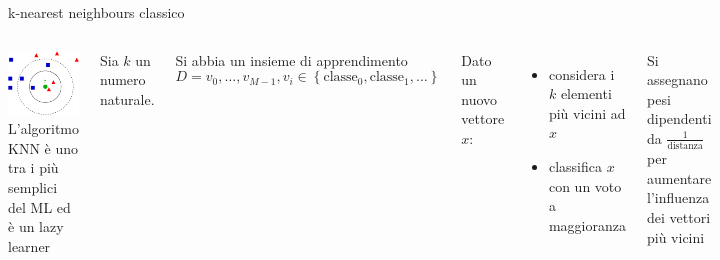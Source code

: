 \documentclass{beamer}
\begin{document}
    \begin{frame}{k-nearest neighbours classico}
        \begin{columns}
            \includegraphics[width=\textwidth]{gfx/KnnClassification.png}
            L'algoritmo KNN è uno tra i più semplici del ML ed è un lazy learner
            \vspace{.5cm}
            
            Sia $k$ un numero naturale. 

            Si abbia un insieme di apprendimento 
            \begin{equation*}
                D = v_0,\ldots,v_{M-1}, v_i\in\left\{ \text{classe}_0, \text{classe}_1, \ldots \right\}
            \end{equation*}

            Dato un nuovo vettore $x$: 
            \begin{itemize}
                \item considera i $k$ elementi più vicini ad $x$
                \item classifica $x$ con un voto a maggioranza
            \end{itemize}

            Si assegnano pesi dipendenti da $\frac{1}{\text{distanza}}$ per aumentare l'influenza 
            dei vettori più vicini
        \end{columns}
    \end{frame}
\end{document}
